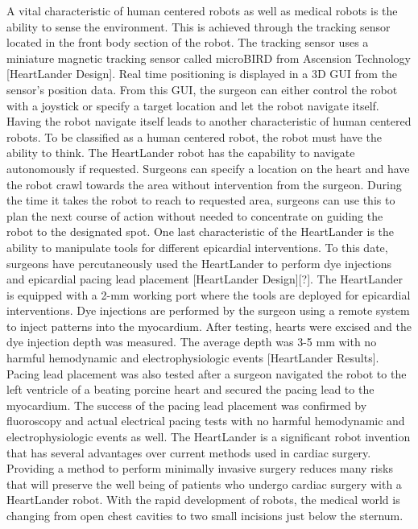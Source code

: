 \documentclass[11pt,conference]{IEEEtran}
\begin{document}
\newline
\indent A vital characteristic of human centered robots as well as medical robots is the ability to sense the environment. This is achieved through the tracking sensor located in the front body section of the robot. The tracking sensor uses a miniature magnetic tracking sensor called microBIRD from Ascension Technology [HeartLander Design]. Real time positioning is displayed in a 3D GUI from the sensor's position data. From this GUI, the surgeon can either control the robot with a joystick or specify a target location and let the robot navigate itself. Having the robot navigate itself leads to another characteristic of human centered robots.
\newline
\indent To be classified as a human centered robot, the robot must have the ability to think. The HeartLander robot has the capability to navigate autonomously if requested. Surgeons can specify a location on the heart and have the robot crawl towards the area without intervention from the surgeon. During the time it takes the robot to reach to requested area, surgeons can use this to plan the next course of action without needed to concentrate on guiding the robot to the designated spot.
\newline
\indent One last characteristic of the HeartLander is the ability to manipulate tools for different epicardial interventions. To this date, surgeons have percutaneously used the HeartLander to perform dye injections and epicardial pacing lead placement [HeartLander Design][?]. The HeartLander is equipped with a 2-mm working port where the tools are deployed for epicardial interventions. Dye injections are performed by the surgeon using a remote system to inject patterns into the myocardium. After testing, hearts were excised and the dye injection depth was measured. The average depth was 3-5 mm with no harmful hemodynamic and electrophysiologic events [HeartLander Results]. Pacing lead placement was also tested after a surgeon navigated the robot to the left ventricle of a beating porcine heart and secured the pacing lead to the myocardium. The success of the pacing lead placement was confirmed by fluoroscopy and actual electrical pacing tests with no harmful hemodynamic and electrophysiologic events as well.
\indent The HeartLander is a significant robot invention that has several advantages over current methods used in cardiac surgery. Providing a method to perform minimally invasive surgery reduces many risks that will preserve the well being of patients who undergo cardiac surgery with a HeartLander robot. With the rapid development of robots, the medical world is changing from open chest cavities to two small incisions just below the sternum. 

\end{document}

